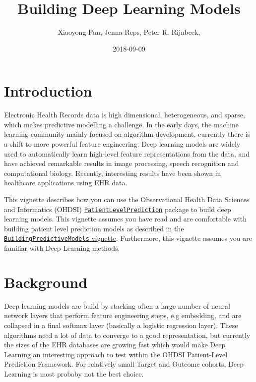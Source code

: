 \documentclass[]{article}
\title{Building Deep Learning Models}
\author{Xiaoyong Pan, Jenna Reps, Peter R. Rijnbeek,}
\date{2018-09-09}
\begin{document}
\maketitle

{
\setcounter{tocdepth}{2}
\tableofcontents
}
\section{Introduction}\label{introduction}

Electronic Health Records data is high dimensional, heterogeneous, and
sparse, which makes predictive modelling a challenge. In the early days,
the machine learning community mainly focused on algorithm development,
currently there is a shift to more powerful feature engineering. Deep
learning models are widely used to automatically learn high-level
feature representations from the data, and have achieved remarkable
results in image processing, speech recognition and computational
biology. Recently, interesting results have been shown in healthcare
applications using EHR data.

This vignette describes how you can use the Observational Health Data
Sciences and Informatics (OHDSI)
\href{http://github.com/OHDSI/PatientLevelPrediction}{\texttt{PatientLevelPrediction}}
package to build deep learning models. This vignette assumes you have
read and are comfortable with building patient level prediction models
as described in the
\href{https://github.com/OHDSI/PatientLevelPrediction/blob/master/inst/doc/BuildingPredictiveModels.pdf}{\texttt{BuildingPredictiveModels}
vignette}. Furthermore, this vignette assumes you are familiar with Deep
Learning methods.

\section{Background}\label{background}

Deep learning models are build by stacking often a large number of
neural network layers that perform feature engineering steps, e.g
embedding, and are collapsed in a final softmax layer (basically a
logistic regression layer). These algorithms need a lot of data to
converge to a good representation, but currently the sizes of the EHR
databases are growing fast which would make Deep Learning an interesting
approach to test within the OHDSI Patient-Level Prediction Framework.
For relatively small Target and Outcome cohorts, Deep Learning is most
probaby not the best choice.
\end{document}
